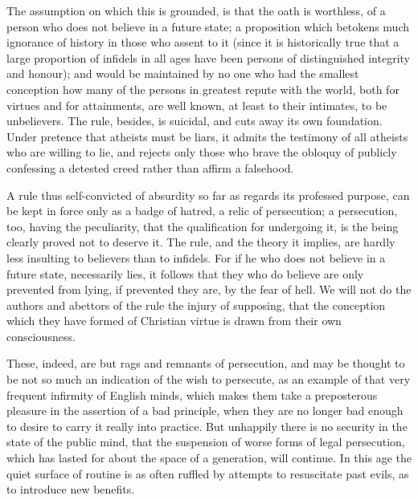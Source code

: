 The assumption on which this is grounded, is that the oath is worthless, of a person who does not believe in a future state; a proposition which betokens much ignorance of history in those who assent to it (since it is historically true that a large proportion of infidels in all ages have been persons of distinguished integrity and honour); and would be maintained by no one who had the smallest conception how many of the persons in greatest repute with the world, both for virtues and for attainments, are well known, at least to their intimates, to be unbelievers. The rule, besides, is suicidal, and cuts away its own foundation. Under pretence that atheists must be liars, it admits the testimony of all atheists who are willing to lie, and rejects only those who brave the obloquy of publicly confessing a detested creed rather than affirm a falsehood.\par

A rule thus self-convicted of absurdity so far as regards its professed purpose, can be kept in force only as a badge of hatred, a relic of persecution; a persecution, too, having the peculiarity, that the qualification for undergoing it, is the being clearly proved not to deserve it. The rule, and the theory it implies, are hardly less insulting to believers than to infidels. For if he who does not believe in a future state, necessarily lies, it follows that they who do believe are only prevented from lying, if prevented they are, by the fear of hell. We will not do the authors and abettors of the rule the injury of supposing, that the conception which they have formed of Christian virtue is drawn from their own consciousness.\par

These, indeed, are but rags and remnants of persecution, and may be thought to be not so much an indication of the wish to persecute, as an example of that very frequent infirmity of English minds, which makes them take a preposterous pleasure in the assertion of a bad principle, when they are no longer bad enough to desire to carry it really into practice. But unhappily there is no security in the state of the public mind, that the suspension of worse forms of legal persecution, which has lasted for about the space of a generation, will continue. In this age the quiet surface of routine is as often ruffled by attempts to resuscitate past evils, as to introduce new benefits.\par


